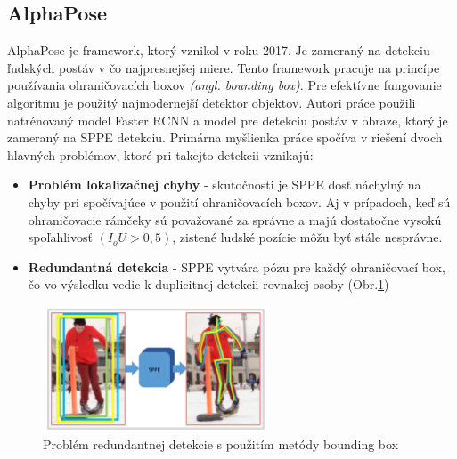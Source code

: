 \documentclass[slovak,master,dept460,male,cpp,cpdeclaration]{diploma}
\begin{document}
\subsection{AlphaPose}
AlphaPose\cite{fang2017rmpe} je framework, ktorý vznikol v roku 2017. Je zameraný na detekciu ľudských postáv  v čo najpresnejšej miere. Tento framework pracuje na princípe používania ohraničovacích boxov \textit{(angl. bounding box)}. Pre efektívne fungovanie algoritmu je použitý najmodernejší detektor objektov. Autori práce použili natrénovaný model Faster RCNN\cite{ren2015faster} a model pre detekciu postáv v obraze\cite{newell2016stacked}, ktorý je zameraný na SPPE detekciu. Primárna myšlienka práce spočíva v riešení dvoch hlavných problémov, ktoré pri takejto detekcii vznikajú:
\begin{itemize}
\item \textbf{Problém lokalizačnej chyby} - skutočnosti je SPPE dosť náchylný na chyby pri spočívajúce v použití ohraničovacích boxov. Aj v prípadoch, keď sú ohraničovacie rámčeky
sú považované za správne a majú dostatočne vysokú spoľahlivosť \textit{$(I_oU > 0,5)$}, zistené ľudské pozície môžu byť stále nesprávne. 
\item \textbf{Redundantná detekcia} - SPPE vytvára pózu pre každý ohraničovací box, čo vo výsledku vedie k duplicitnej detekcii rovnakej osoby (Obr.\ref{fig:alphaPoseRedundant})
\end{itemize}

\begin{figure}[H]
	\centering
	\includegraphics[width=0.6\textwidth]{Figures/alphaPoseRedundant.png}
	\caption{Problém redundantnej detekcie s použitím metódy bounding box\cite{fang2017rmpe}}
	\label{fig:alphaPoseRedundant}
\end{figure}
\end{document}
